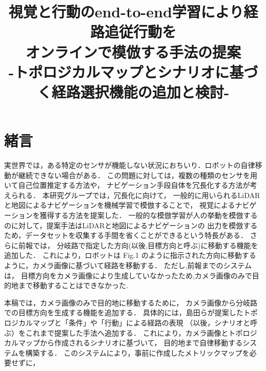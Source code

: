 \documentclass{sice-si}
\title{視覚と行動のend-to-end学習により経路追従行動を\\
オンラインで模倣する手法の提案\\
-トポロジカルマップとシナリオに基づく経路選択機能の追加と検討-\\} %
\begin{document}

\maketitle

\section{緒言}
実世界では，ある特定のセンサが機能しない状況におちいり．ロボットの自律移動が継続できない場合がある．
この問題に対しては，複数の種類のセンサを用いて自己位置推定する方法や，
ナビゲーション手段自体を冗長化する方法が考えられる．
本研究グループでは，冗長化に向けて，
一般的に用いられるLiDARと地図によるナビゲーションを機械学習で模倣することで，
視覚によるナビゲーションを獲得する方法を提案した\cite{haruyama2022}\cite{fujiwara2023}．
一般的な模倣学習が人の挙動を模倣するのに対して，提案手法はLiDARと地図によるナビゲーションの
出力を模倣するため，データセットを収集する手間を省くことができるという特長がある．
さらに前報\cite{haruyama2022}\cite{fujiwara2023}では，
分岐路で指定した方向(以後,目標方向と呼ぶ)に移動する機能を追加した．
これにより，ロボットは Fig.1 のように指示された方向に移動するように，カメラ画像に基づいて経路を移動する．
ただし,前報までのシステムは，
目標方向をカメラ画像により生成していなかったため,カメラ画像のみで目的地まで移動することはできなかった.
\par
本稿では，カメラ画像のみで目的地に移動するために，
カメラ画像から分岐路での目標方向を生成する機能を追加する．
具体的には，島田ら\cite{shimada2020}が提案したトポロジカルマップと「条件」や「行動」による経路の表現
（以後，シナリオと呼ぶ）をこれまで提案した手法へ追加する．
これにより，カメラ画像とトポロジカルマップから作成されるシナリオに基づいて，
目的地まで自律移動するシステムを構築する．
このシステムにより，事前に作成したメトリックマップを必要せずに，
\end{document}
